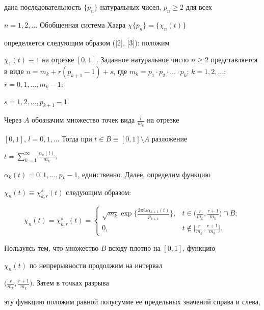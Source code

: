 дана последовательность $\{p_{n}\}$ натуральных чисел, $p_{n}\geq 2$ для всех 


$n=1,2,\dotsc$ Обобщенная система Хаара $\chi\{p_{n}\}=\{\chi_{n}(t)\}$ 


определяется следующим образом ([2], [3]): положим 


$\chi_{1}(t)\equiv 1$ на отрезке $[0,1]$. Заданное натуральное число $n\geq 


2$ представляется в виде $n=m_{k}+r(p_{k+1}-1)+s$, где $m_{k}=p_{1}\cdot 


p_{2}\cdot\dotsc\cdot p_{k}$; $k=1,2,\dotsc$; $r=0,1,\dotsc,m_{k}-1$;


$s=1,2,\dotsc,p_{k+1}-1$.





Через $A$ обозначим множество точек вида $\frac{l}{m_{k}}$ на отрезке 


$[0,1]$, $l=0,1,\dotsc$ Тогда при $t\in B\equiv [0,1]\setminus A$ разложение 


$t=\sum\limits_{k=1}^{\infty}\frac{\alpha_{k}(t)}{m_{k}}$,


$\alpha_{k}(t)=0,1,\dotsc,p_{k}-1$, единственно. Далее, определим функцию 


$\chi_{n}(t)\equiv\chi_{k,r}^{s}(t)$ следующим образом:


$$


\chi_{n}(t)=\chi_{k,r}^{s}(t)=


\begin{cases}


\sqrt{m_{k}} \exp\big\{\frac{2\pi 


is\alpha_{k+1}(t)}{p_{k+1}}\big\}, & t\in 


\big(\frac{r}{m_{k}}, \frac{r+1}{m_{k}}\big)\cap B;\\[2mm]


0, & t\notin \big[\frac{r}{m_{k}}, 


\frac{r+1}{m_{k}}\big].


\end{cases}


$$


Пользуясь тем, что множество $B$ всюду плотно на $[0,1]$, функцию 


$\chi_{n}(t)$  по непрерывности продолжим на интервал 


$\big(\frac{r}{m_{k}}, \frac{r+1}{m_{k}}\big)$. Затем в точках разрыва 


эту функцию положим равной полусумме ее предельных значений справа и слева, 


